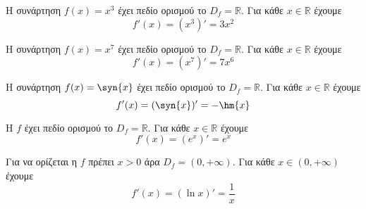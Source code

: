 \begin{alist}
\item Η συνάρτηση $ f(x)=x^3 $ έχει πεδίο ορισμού το $ D_f=\mathbb{R} $. Για κάθε $ x\in\mathbb{R} $ έχουμε
\[ f'(x)=(x^3)'=3x^2 \]
\item Η συνάρτηση $ f(x)=x^7 $ έχει πεδίο ορισμού το $ D_f=\mathbb{R} $. Για κάθε $ x\in\mathbb{R} $ έχουμε
\[ f'(x)=(x^7)'=7x^6 \]
\item Η συνάρτηση $ f(x)=\syn{x} $ έχει πεδίο ορισμού το $ D_f=\mathbb{R} $. Για κάθε $ x\in\mathbb{R} $ έχουμε
\[ f'(x)=(\syn{x})'=-\hm{x} \]
\item Η $ f $ έχει πεδίο ορισμού το $ D_f=\mathbb{R} $. Για κάθε $ x\in\mathbb{R} $ έχουμε
\[ f'(x)=(e^x)'=e^x \]
\item Για να ορίζεται η $ f $ πρέπει $ x>0 $ άρα $ D_f=(0,+\infty) $. Για κάθε $ x\in(0,+\infty) $ έχουμε
\[ f'(x)=(\ln{x})'=\dfrac{1}{x} \]
\end{alist}
